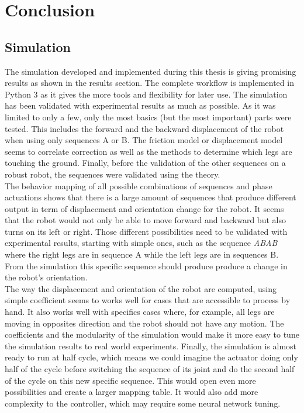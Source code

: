 \chapter{Conclusion}

\section{Simulation}
    The simulation developed and implemented during this thesis is giving promising results as shown in the results section. The complete workflow is implemented in Python 3 as it gives the more tools and flexibility for later use. The simulation has been validated with experimental results as much as possible. As it was limited to only a few, only the most basics (but the most important) parts were tested. This includes the forward and the backward displacement of the robot when using only sequences A or B. The friction model or displacement model seems to correlate correction as well as the methods to determine which legs are touching the ground. Finally, before the validation of the other sequences on a robust robot, the sequences were validated using the theory.\\
    
    The behavior mapping of all possible combinations of sequences and phase actuations shows that there is a large amount of sequences that produce different output in term of displacement and orientation change for the robot. It seems that the robot would not only be able to move forward and backward but also turns on its left or right. Those different possibilities need to be validated with experimental results, starting with simple ones, such as the sequence \textit{ABAB} where the right legs are in sequence A while the left legs are in sequences B. From the simulation this specific sequence should produce produce a change in the robot's orientation.\\
    
    The way the displacement and orientation of the robot are computed, using simple coefficient seems to works well for cases that are accessible to process by hand. It also works well with specifics cases where, for example, all legs are moving in opposites direction and the robot should not have any motion. The coefficients and the modularity of the simulation would make it more easy to tune the simulation results to real world experiments. Finally, the simulation is almost ready to run at half cycle, which means we could imagine the actuator doing only half of the cycle before switching the sequence of its joint and do the second half of the cycle on this new specific sequence. This would open even more possibilities and create a larger mapping table. It would also add more complexity to the controller, which may require some neural network tuning.
    

